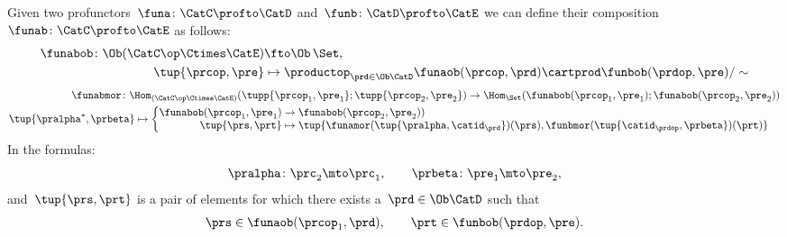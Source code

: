 \begin{widepar}
	\begin{ctdefinition}
		\label{def:profunctor-composition}
		Given two profunctors~$\funa\colon \CatC \profto \CatD$ and~$\funb\colon \CatD \profto \CatE$
		we can define their composition~$\funab\colon \CatC \profto \CatE$ as follows:
		\begin{equation}
			\begin{aligned}
				\funabob \colon \Ob(\CatC\op \Ctimes \CatE) & \fto  \Ob\, \Set,                                                                                  \\
				\tup{\prcop, \pre}                          & \mapsto \productop_{\prd\in\Ob \CatD} \funaob(\prcop, \prd) \cartprod \funbob(\prdop, \pre) / \sim
			\end{aligned}
		\end{equation}
		\begin{equation}
			\begin{aligned}
				\funabmor  \colon \Hom_{(\CatC\op \Ctimes \CatE)}( \tupp{\prcop_1, \pre_1}; \tupp{\prcop_2, \pre_2}) \to \Hom_{\Set}( \funabob(\prcop_1, \pre_1); \funabob(\prcop_2, \pre_2)) \\
				\tup{\pralpha^\ast, \prbeta} \mapsto  \begin{cases}
					\begin{aligned}
						\funabob(\prcop_1, \pre_1) & \to   \funabob(\prcop_2, \pre_2)) \\
						\tup{\prs, \prt}           & \mapsto  \tup{
							\funamor(\tup{\pralpha, \catid_{\prd}})(\prs),
							\funbmor(\tup{\catid_{\prdop}, \prbeta})(\prt)}
					\end{aligned}
				\end{cases}
			\end{aligned}
		\end{equation}
		In the formulas:
		\begin{equation}
			\pralpha\colon \prc_2 \mto \prc_1, \qquad
			\prbeta\colon \pre_1 \mto \pre_2,
		\end{equation}
		and~$\tup{\prs, \prt}$ is a pair of elements for which there exists a~$\prd\in\Ob \CatD$ such that
		\begin{equation}
			\prs \in \funaob(\prcop_1, \prd), \qquad\prt \in \funbob(\prdop, \pre).
		\end{equation}
	\end{ctdefinition}
\end{widepar}

